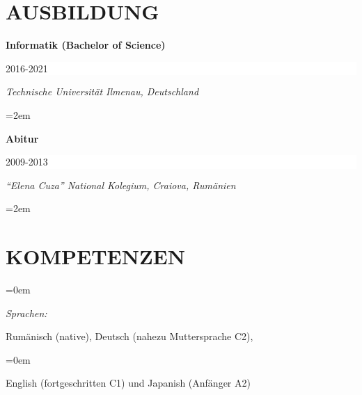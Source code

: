 \documentclass[paper=a4,fontsize=10.4pt]{scrartcl} %
\newlength{\spacebox}
\newcommand{\sepspace}{\vspace*{0.5em}}		%
\newcommand{\NewPart}[1]{\section*{\uppercase{#1}}}
\newcommand{\PersonalEntry}[2]{
		\noindent\hangindent=0em\hangafter=0 %
		\parbox{\spacebox}{        %
		\mbox {\textit{#1}}}		       %
		\hspace{5em} #2 \par}    %
\newcommand{\SkillsEntry}[2]{      %
		\noindent\hangindent=0em\hangafter=0 %
		\parbox{\spacebox}{        %
		\mbox{\textit{#1}}}			   %
		\hspace{6em} #2 \par}    %
\newcommand{\EducationEntry}[4]{
		\noindent \textbf{#1} \hfill      %
		\colorbox{White}{%
			\parbox{16em}{%
			\hfill\color{Black}#2}} \par  %
		\noindent \textit{#3} \par        %
		\noindent\hangindent=2em\hangafter=0 \small #4 %
		\normalsize \par}
\begin{document}
\NewPart{Ausbildung}{}
\EducationEntry{\color[HTML]{6a040f}Informatik (Bachelor of Science)}{2016-2021}{Technische Universität Ilmenau, Deutschland}{%
}

 \sepspace

\EducationEntry{\color[HTML]{6a040f}Abitur}{2009-2013}{“Elena Cuza” National Kolegium, Craiova, Rumänien}{%
}


%




\NewPart{KOMPETENZEN}{}

\SkillsEntry{Sprachen:}{Rumänisch (native), Deutsch (nahezu Muttersprache C2),  }
\SkillsEntry{}{English (fortgeschritten C1) und Japanish (Anfänger A2)}
\end{document}
